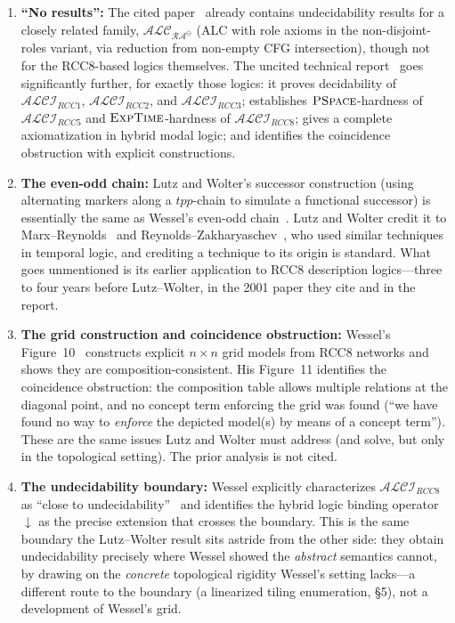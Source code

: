 \documentclass[11pt]{article}
\newcommand{\ALCIRCC}[1]{\ensuremath{\mathcal{ALCI}_{\mathit{RCC#1}}}}
\newcommand{\EXPTIME}{\textsc{ExpTime}}
\newcommand{\PSPACE}{\textsc{PSpace}}
\begin{document}
\begin{enumerate}
  \item \textbf{``No results'':}
    The cited paper~\cite{Wessel2001} already contains undecidability results
    for a closely related family, $\mathcal{ALC}_{\mathcal{RA}^\ominus}$ (ALC
    with role axioms in the non-disjoint-roles variant, via reduction from
    non-empty CFG intersection), though not for the RCC8-based logics
    themselves.  The uncited technical
    report~\cite{Wessel2003} goes significantly further, for exactly those
    logics: it proves
    decidability of $\ALCIRCC{1}$, $\ALCIRCC{2}$, and $\ALCIRCC{3}$;
    establishes $\PSPACE$-hardness of $\ALCIRCC{5}$ and $\EXPTIME$-hardness
    of $\ALCIRCC{8}$; gives a complete axiomatization in hybrid modal logic;
    and identifies the coincidence obstruction with explicit constructions.

  \item \textbf{The even-odd chain:}
    Lutz and Wolter's successor construction (using alternating markers along
    a $tpp$-chain to simulate a functional successor) is essentially the same
    as Wessel's even-odd chain~\cite{Wessel2003}.  Lutz and Wolter credit it
    to Marx--Reynolds~\cite{MarxReynolds1999} and
    Reynolds--Zakharyaschev~\cite{ReynoldsZakharyaschev2001}, who used similar
    techniques in temporal logic, and crediting a technique to its origin is
    standard.  What goes unmentioned is its earlier application to RCC8
    description logics---three to four years before Lutz--Wolter, in the 2001
    paper they cite and in the report.

  \item \textbf{The grid construction and coincidence obstruction:}
    Wessel's Figure~10~\cite{Wessel2003} constructs explicit $n \times n$
    grid models from RCC8 networks and shows they are composition-consistent.
    His Figure~11 identifies the coincidence obstruction: the composition
    table allows multiple relations at the diagonal point, and no concept term
    enforcing the grid was found (``we have found no way to \emph{enforce} the
    depicted model(s) by means of a concept term'').  These are the same issues Lutz and
    Wolter must address (and solve, but only in the topological setting).
    The prior analysis is not cited.

  \item \textbf{The undecidability boundary:}
    Wessel explicitly characterizes $\ALCIRCC{8}$ as ``close to
    undecidability''~\cite{Wessel2003} and identifies the hybrid logic
    binding operator $\downarrow$ as the precise extension that crosses the
    boundary.  This is the same boundary the Lutz--Wolter result sits astride
    from the other side: they obtain undecidability precisely where Wessel
    showed the \emph{abstract} semantics cannot, by drawing on the
    \emph{concrete} topological rigidity Wessel's setting lacks---a different
    route to the boundary (a linearized tiling enumeration, \S5), not a
    development of Wessel's grid.
\end{enumerate}
\end{document}
